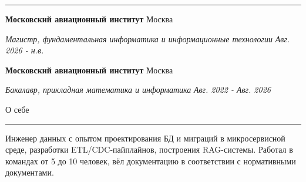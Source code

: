 \documentclass[14pt, a4paper, oneside]{extarticle}
\begin{document}
\vspace{-0.8\intextsep}
\hrule


\begin{flushleft}
	\vspace{-0.8\intextsep}
	\quad
	\textbf{Московский авиационный институт}
	\hfill
	Москва
\end{flushleft}

\begin{flushleft}
	\vspace{-\intextsep}
	\quad
	\textit{\footnotesize Магистр, фундаментальная информатика и информационные технологии} 
	\hfill
	\textit{\small Авг. 2026 - н.в.}
\end{flushleft}


\begin{flushleft}
	\vspace{-0.8\intextsep}
	\quad
	\textbf{Московский авиационный институт}
	\hfill
	Москва
\end{flushleft}

\begin{flushleft}
	\vspace{-\intextsep}
	\quad
	\textit{Бакалавр, прикладная математика и информатика}
	\hfill
	\textit{\small Авг. 2022 - Авг. 2026}
\end{flushleft}


\begin{flushleft}
	\vspace{-\intextsep}
	\large О себе
\end{flushleft}

\vspace{-0.8\intextsep}
\hrule

\begin{sloppypar}
	\vspace{0.5\intextsep}
	\quad
	Инженер данных с опытом проектирования БД и миграций в микросервисной среде, разработки ETL/CDC-пайплайнов, построения RAG-системы. Работал в командах от 5 до 10 человек, вёл документацию в соответствии с нормативными документами.
\end{sloppypar}
\end{document}
